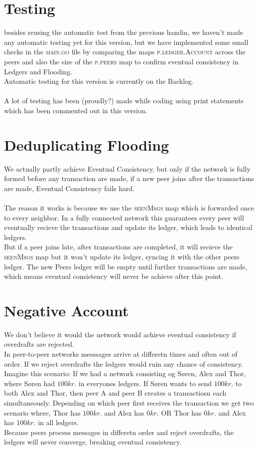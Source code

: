 \documentclass[12pt]{article}
\begin{document}
\section*{Testing}
besides reusing the automatic test from the previous handin, we haven't made any automatic testing yet for this version, but we have implemented some small checks in the \textsc{main.go} file by comparing the maps \textsc{p.ledger.Account} across the peers and also the size of the \textsc{p.peers} map to confirm eventual consistency in Ledgers and Flooding.\\
Automatic testing for this version is currently on the Backlog.\\\\
A lot of testing has been (proudly?) made while coding using print statements which has been commented out in this version.



\section*{Deduplicating Flooding}
We actually partly achieve Eventual Consistency, but only if the network is fully formed before any transaction are made, if a new peer joins after the transactions are made, Eventual Consistency fails hard.\\\\
\noindent The reason it works is because we use the \textsc{seenMsgs} map which is forwarded once to every neighbor. In a fully connected network this guarantees every peer will eventually recieve the transactions and update its ledger, which leads to identical ledgers.\\
But if a peer joins late, after transactions are completed, it will recieve the \textsc{seenMsgs} map but it won't update its ledger, syncing it with the other peers ledger. The new Peers ledger will be empty until further transactions are made, which means eventual consistency will never be achieve after this point.\\
\section*{Negative Account}
We don't believe it would the network would achieve eventual consistency if overdrafts are rejected.\\
In peer-to-peer networks messsages arrive at differetn times and often out of order. If we reject overdrafts the ledgers would ruin any chance of consistency.\\
Imagine this scenario: If we had a network consisting og Søren, Alex and Thor, where Søren had $100 kr.$ in everyones ledgers. If Søren wants to send $100 kr.$ to both Alex and Thor, then peer A and peer B creates a transactiosn each simultaneously. Depending on which peer first receives the transaction we get two scenario where, Thor has $100 kr.$ and Alex has $0 kr.$ OR Thor has $0 kr.$ and Alex has $100 kr.$ in all ledgers.\\
Because peers process messages in differetn order and reject overdrafts, the ledgers will never converge, breaking eventual consistency.
\end{document}
